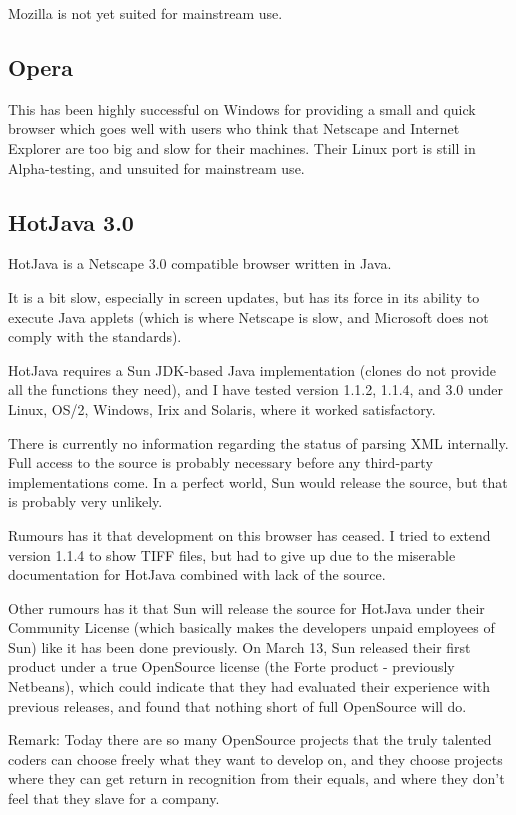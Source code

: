 Mozilla is not yet suited for mainstream use.


\subsection{Opera}
\label{sec:opera}

This  has been highly
successful on Windows for providing a small and quick browser which
goes well with users who think that Netscape and Internet Explorer are
too big and slow for their machines.  Their Linux port is still in
Alpha-testing, and unsuited for mainstream use.


\subsection{HotJava 3.0}
\label{sec:hotjava}

HotJava is a Netscape 3.0 compatible browser written in Java.

It is a bit slow, especially in screen updates, but has its force in
its ability to execute Java applets (which is where Netscape is slow,
and Microsoft does not comply with the standards).

HotJava requires a Sun JDK-based Java implementation (clones do not
provide all the functions they need), and I have tested version 1.1.2,
1.1.4, and 3.0 under Linux, OS/2, Windows, Irix and Solaris, where it
worked satisfactory.

There is currently no information regarding the status of parsing XML
internally.  Full access to the source is probably necessary before
any third-party implementations come.  In a perfect world, Sun would
release the source, but that is probably very unlikely.

Rumours has it that development on this browser has ceased.  I tried
to extend version 1.1.4 to show TIFF files, but had to give up due to
the miserable documentation for HotJava combined with lack of the
source.

Other rumours has it that Sun will release the source for HotJava
under their Community License (which basically makes the developers
unpaid employees of Sun) like it has been done previously.  On March
13, Sun released their first product under a true OpenSource license
(the Forte product - previously Netbeans), which could indicate that
they had evaluated their experience with previous releases, and found
that nothing short of full OpenSource will do.

Remark: Today there are so many OpenSource projects that the truly
talented coders can choose freely what they want to develop on, and
they choose projects where they can get return in recognition from
their equals, and where they don't feel that they slave for a company.

